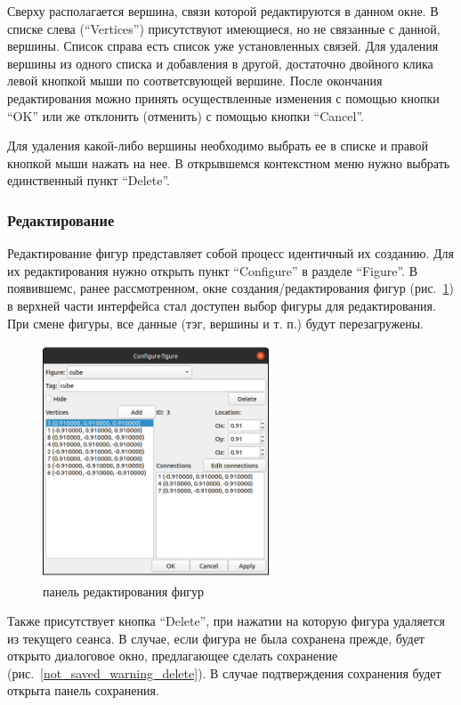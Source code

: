 \documentclass[12pt, a4paper, hidelinks]{article}
\begin{document}
Сверху располагается вершина, связи которой редактируются в данном окне. В списке слева (\enquote{Vertices}) присутствуют имеющиеся, но не связанные с данной, вершины. Список справа есть список уже установленных связей. Для удаления вершины из одного списка и добавления в другой, достаточно двойного клика левой кнопкой мыши по соответсвующей вершине. После окончания редактирования можно принять осуществленные изменения с помощью кнопки \enquote{OK} или же отклонить (отменить) с помощью кнопки \enquote{Cancel}.
 
 Для удаления какой-либо вершины необходимо выбрать ее в списке и правой кнопкой мыши нажать на нее. В открывшемся контекстном меню нужно выбрать единственный пункт \enquote{Delete}.
 
\subsubsection{Редактирование}
Редактирование фигур представляет собой процесс идентичный их созданию. Для их редактирования нужно открыть пункт \enquote{Configure} в разделе \enquote{Figure}. В появившемс, ранее рассмотренном, окне создания/редактирования фигур (рис.~\ref{figure_cfg}) в верхней части интерфейса стал доступен выбор фигуры для редактирования. При смене фигуры, все данные (тэг, вершины и т. п.) будут перезагружены.

\begin{figure}[htbp!]
	\centering
	\includegraphics[width=0.6\textwidth]{images/figurecfg.png}
	\caption{панель редактирования фигур}
	\label{figure_cfg}
\end{figure}

Также присутствует кнопка \enquote{Delete}, при нажатии на которую фигура удаляется из текущего сеанса. В случае, если фигура не была сохранена прежде, будет открыто диалоговое окно, предлагающее сделать сохранение (рис.~\ref{not_saved_warning_delete}). В случае подтверждения сохранения будет открыта панель сохранения.
\end{document}
